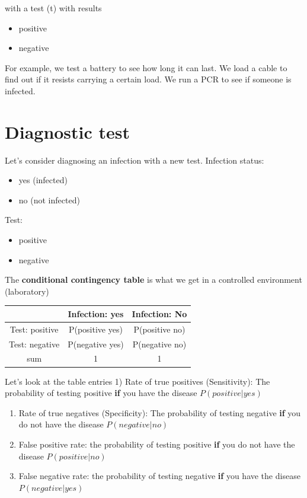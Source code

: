 \documentclass[
]{book}
\providecommand{\tightlist}{%
  \setlength{\itemsep}{0pt}\setlength{\parskip}{0pt}}
\begin{document}
with a test (t) with results

\begin{itemize}
\tightlist
\item
  positive
\item
  negative
\end{itemize}

For example, we test a battery to see how long it can last. We load a cable to find out if it resists carrying a certain load. We run a PCR to see if someone is infected.

\hypertarget{diagnostic-test}{%
\section{Diagnostic test}\label{diagnostic-test}}

Let's consider diagnosing an infection with a new test. Infection status:

\begin{itemize}
\tightlist
\item
  yes (infected)
\item
  no (not infected)
\end{itemize}

Test:

\begin{itemize}
\tightlist
\item
  positive
\item
  negative
\end{itemize}

The \textbf{conditional contingency table} is what we get in a controlled environment (laboratory)

\begin{longtable}[]{@{}ccc@{}}
\toprule
& Infection: yes & Infection: No \\
\midrule
\endhead
Test: positive & P(positive {\textbar{}} yes) & P(positive {\textbar{}} no) \\
Test: negative & P(negative {\textbar{}} yes) & P(negative {\textbar{}} no) \\
sum & 1 & 1 \\
\bottomrule
\end{longtable}

Let's look at the table entries
1) Rate of true positives (Sensitivity): The probability of testing positive \textbf{if} you have the disease \(P(positive| yes)\)

\begin{enumerate}
\def\labelenumi{\arabic{enumi})}
\setcounter{enumi}{1}
\item
  Rate of true negatives (Specificity): The probability of testing negative \textbf{if} you do not have the disease \(P(negative| no)\)
\item
  False positive rate: the probability of testing positive \textbf{if} you do not have the disease \(P(positive| no)\)
\item
  False negative rate: the probability of testing negative \textbf{if} you have the disease \(P(negative| yes)\)
\end{enumerate}
\end{document}
